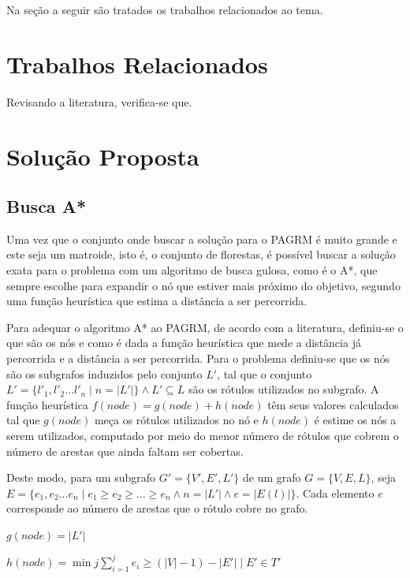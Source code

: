 \documentclass[12pt]{article}
\begin{document}
	Na seção a seguir são tratados os trabalhos relacionados ao tema.

\section{Trabalhos Relacionados}\label{sec:trabalhosRelacionados}

	Revisando a literatura, verifica-se que.

\section{Solução Proposta}\label{sec:solucao}

	\subsection{Busca A*}\label{sec:aestrela}

		Uma vez que o conjunto onde buscar a solução para o PAGRM é muito grande e este seja um matroide, isto é, o conjunto de florestas, é possível buscar a solução exata para o problema com um algoritmo de busca gulosa, como é o A*, que sempre escolhe para expandir o nó que estiver mais próximo do objetivo, segundo uma função heurística que estima a distância a ser percorrida.

		Para adequar o algoritmo A* ao PAGRM, de acordo com a literatura, definiu-se o que são os nós e como é dada a função heurística que mede a distância já percorrida e a distância a ser percorrida. Para o problema definiu-se que os nós são os subgrafos induzidos pelo conjunto $L'$, tal que o conjunto $L' = \{l'_1, l'_2 \dots l'_n \mid n = |L'|\} \wedge L' \subseteq L$ são os rótulos utilizados no subgrafo. A função heurística $f(node) = g(node) + h(node)$ têm seus valores calculados tal que $g(node)$ meça os rótulos utilizados no nó e $h(node)$ é estime os nós a serem utilizados, computado por meio do menor número de rótulos que cobrem o número de arestas que ainda faltam ser cobertas.

		Deste modo, para um subgrafo $G' = \{V', E', L'\}$ de um grafo $G = \{V, E, L\}$, seja $E = \{e_1, e_2 \dots e_n \mid e_1 \geq e_2 \geq \dots \geq e_n \wedge n = |L'| \wedge e = |E(l)|\}$. Cada elemento $e$ corresponde ao número de arestas que o rótulo cobre no grafo.

		$g(node) = |L'|$

		$h(node) = \displaystyle{\min j \sum_{i = 1}^{j}{e_i} \geq (|V| - 1) - |E'| \mid E' \in T'}$
\end{document}

